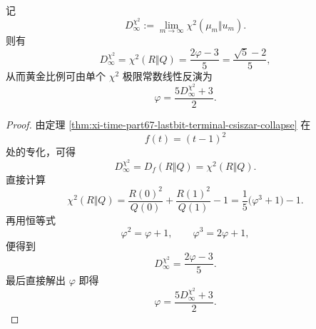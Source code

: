 \begin{theorem}\label{thm:xi-time-part9sa-chi2-affine-phi-inversion}
记
\[
D_\infty^{\chi^2}
:=
\lim_{m\to\infty}\chi^2(\mu_m\Vert u_m).
\]
则有
\[
D_\infty^{\chi^2}
=
\chi^2(R\Vert Q)
=
\frac{2\varphi-3}{5}
=
\frac{\sqrt5-2}{5},
\]
从而黄金比例可由单个 \(\chi^2\) 极限常数线性反演为
\[
\varphi=\frac{5D_\infty^{\chi^2}+3}{2}.
\]
\end{theorem}
\begin{proof}
由定理 \ref{thm:xi-time-part67-lastbit-terminal-csiszar-collapse} 在
\[
f(t)=(t-1)^2
\]
处的专化，可得
\[
D_\infty^{\chi^2}
=
D_f(R\Vert Q)
=
\chi^2(R\Vert Q).
\]
直接计算
\[
\chi^2(R\Vert Q)
=
\frac{R(0)^2}{Q(0)}+\frac{R(1)^2}{Q(1)}-1
=
\frac{1}{5}\bigl(\varphi^3+1\bigr)-1.
\]
再用恒等式
\[
\varphi^2=\varphi+1,
\qquad
\varphi^3=2\varphi+1,
\]
便得到
\[
D_\infty^{\chi^2}
=
\frac{2\varphi-3}{5}.
\]
最后直接解出 \(\varphi\) 即得
\[
\varphi=\frac{5D_\infty^{\chi^2}+3}{2}.
\]
\end{proof}

